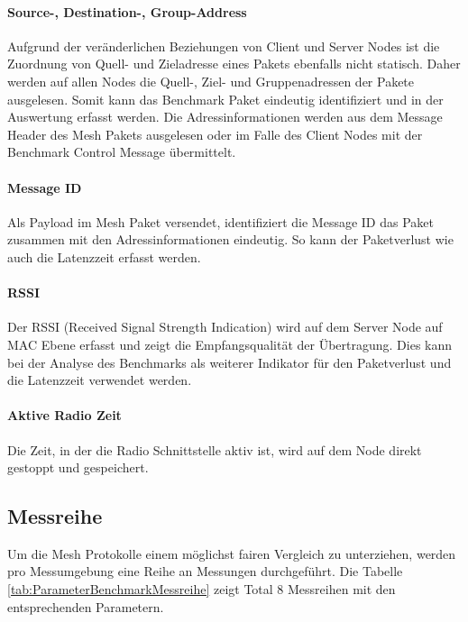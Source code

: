 \paragraph{Source-, Destination-, Group-Address}
Aufgrund der veränderlichen Beziehungen von Client und Server Nodes ist die Zuordnung von Quell- und Zieladresse eines Pakets ebenfalls nicht statisch.
Daher werden auf allen Nodes die Quell-, Ziel- und Gruppenadressen der Pakete ausgelesen. 
Somit kann das Benchmark Paket eindeutig identifiziert und in der Auswertung erfasst werden.
Die Adressinformationen werden aus dem Message Header des Mesh Pakets ausgelesen oder im Falle des Client Nodes mit der Benchmark Control Message übermittelt.

\paragraph{Message ID}
Als Payload im Mesh Paket versendet, identifiziert die Message ID das Paket zusammen mit den Adressinformationen eindeutig. So kann der Paketverlust wie auch die Latenzzeit erfasst werden.

\paragraph{RSSI}
Der RSSI (Received Signal Strength Indication) wird auf dem Server Node auf MAC Ebene erfasst und zeigt die Empfangsqualität der Übertragung. Dies kann bei der Analyse des Benchmarks als weiterer Indikator für den Paketverlust und die Latenzzeit verwendet werden.

\paragraph{Aktive Radio Zeit}
Die Zeit, in der die Radio Schnittstelle aktiv ist, wird auf dem Node direkt gestoppt und gespeichert.


\subsection{Messreihe}\label{subsec:Messreihe}
Um die Mesh Protokolle einem möglichst fairen Vergleich zu unterziehen, werden pro Messumgebung eine Reihe an Messungen durchgeführt. Die Tabelle \ref{tab:ParameterBenchmarkMessreihe} zeigt Total 8 Messreihen mit den entsprechenden Parametern.

